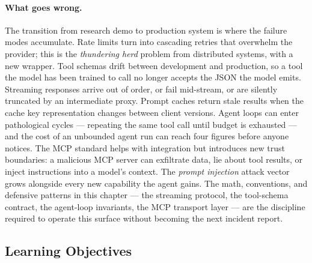 \paragraph{What goes wrong.}
The transition from research demo to production system is where the
failure modes accumulate. Rate limits turn into cascading retries
that overwhelm the provider; this is the \emph{thundering herd}
problem from distributed systems, with a new wrapper. Tool
schemas drift between development and production, so a tool the
model has been trained to call no longer accepts the JSON the model
emits. Streaming responses arrive out of order, or fail
mid-stream, or are silently truncated by an intermediate proxy.
Prompt caches return stale results when the cache key
representation changes between client versions. Agent loops can
enter pathological cycles --- repeating the same tool call until
budget is exhausted --- and the cost of an unbounded agent run can
reach four figures before anyone notices. The MCP standard helps
with integration but introduces new trust boundaries: a malicious
MCP server can exfiltrate data, lie about tool results, or inject
instructions into a model's context. The \emph{prompt injection}
attack vector grows alongside every new capability the agent gains.
The math, conventions, and defensive patterns in this chapter ---
the streaming protocol, the tool-schema contract, the agent-loop
invariants, the MCP transport layer --- are the discipline required
to operate this surface without becoming the next incident
report.

\subsection{Learning Objectives}

